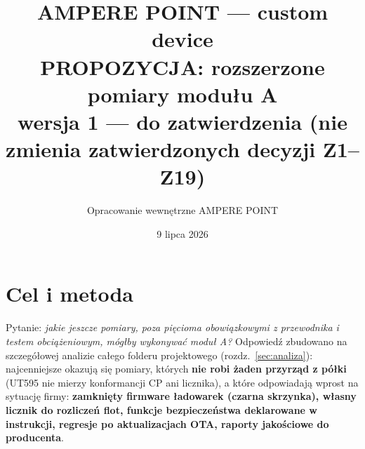 \documentclass[11pt,a4paper]{article}
\title{\textbf{AMPERE POINT --- custom device}\\[4pt]
\large PROPOZYCJA: rozszerzone pomiary modułu A\\[2pt]
\normalsize wersja 1 --- do zatwierdzenia (nie zmienia zatwierdzonych decyzji Z1--Z19)}
\author{Opracowanie wewnętrzne AMPERE POINT}
\date{9 lipca 2026}
\begin{document}
\maketitle
\vspace{-1.4em}

\section{Cel i metoda}
Pytanie: \emph{jakie jeszcze pomiary, poza pięcioma obowiązkowymi z przewodnika i testem
obciążeniowym, mógłby wykonywać moduł A?} Odpowiedź zbudowano na szczegółowej analizie całego
folderu projektowego (rozdz.~\ref{sec:analiza}): najcenniejsze okazują się pomiary, których
\textbf{nie robi żaden przyrząd z półki} (UT595 nie mierzy konformancji CP ani licznika), a które
odpowiadają wprost na sytuację firmy: \textbf{zamknięty firmware ładowarek (czarna skrzynka),
własny licznik do rozliczeń flot, funkcje bezpieczeństwa deklarowane w instrukcji, regresje po
aktualizacjach OTA, raporty jakościowe do producenta}.
\end{document}
